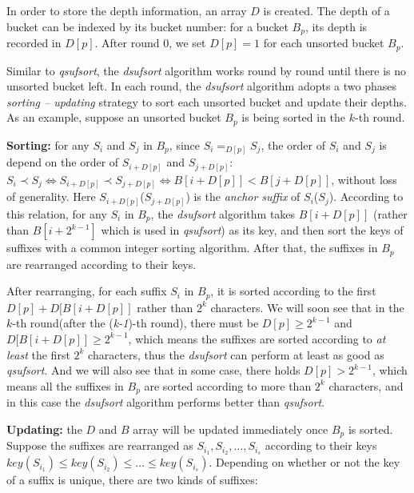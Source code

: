 \documentclass{ws-ijprai}
\begin{document}
In order to store the depth information, an array $D$ is created.
The depth of a bucket can be indexed by its bucket number: for a
bucket $B_p$, its depth is recorded in $D[p]$. After round 0, we set
$D[p] = 1$ for each unsorted bucket $B_p$.

Similar to \emph{qsufsort}, the \emph{dsufsort} algorithm works round
by round until there is no unsorted bucket left. In each round, the
\emph{dsufsort} algorithm adopts a two phases \emph{sorting --
updating} strategy to sort each unsorted bucket and update their
depths. As an example, suppose an unsorted bucket $B_p$ is being
sorted in the $k$-th round.

\begin{arabiclist}
\item \textbf{Sorting:} for any $S_i$ and $S_j$ in $B_p$, since $S_i
=_{D[p]} S_j$, the order of $S_i$ and $S_j$ is depend on the order of
$S_{i+D[p]}$ and $S_{j+D[p]}$: $S_i \prec S_j \iff S_{i+D[p]} \prec
S_{j+D[p]} \iff B[i+D[p]] < B[j+D[p]]$, without loss of
generality. Here $S_{i+D[p]}$($S_{j+D[p]}$) is the \emph{anchor
suffix} of $S_i$($S_j$). According to this relation, for any $S_i$ in
$B_p$, the \emph{dsufsort} algorithm takes $B[i+D[p]]$ (rather than
$B[i+2^{k-1}]$ which is used in \emph{qsufsort}) as its key, and then
sort the keys of suffixes with a common integer sorting
algorithm. After that, the suffixes in $B_p$ are rearranged according
to their keys.

After rearranging, for each suffix $S_i$ in $B_p$, it is sorted according to the first
$D[p] + D[B[i+D[p]]$ rather than $2^k$ characters.  We will soon see
that in the $k$-th round(after the (\emph{k-1})-th round), there must
be $D[p] \geq 2^{k-1}$ and $D[B[i+D[p]] \geq 2^{k-1}$, which means the
suffixes are sorted according to \emph{at least} the first $2^k$
characters, thus the \emph{dsufsort} can perform at least as good as
\emph{qsufsort}. And we will also see that in some case, there holds
$D[p] > 2^{k-1}$, which means all the suffixes in $B_p$ are sorted
according to more than $2^k$ characters, and in this case the
\emph{dsufsort} algorithm performs better than \emph{qsufsort}.

\item \textbf{Updating:} the $D$ and $B$ array will be updated immediately
once $B_p$ is sorted. Suppose the suffixes are rearranged as $S_{i_1},
S_{i_2},\dots,S_{i_s}$ according to their keys $key(S_{i_1}) \leq
key(S_{i_2}) \leq \dots \leq key(S_{i_s})$. Depending on whether or
not the key of a suffix is unique, there are two kinds of suffixes:


\end{arabiclist}
\end{document}
